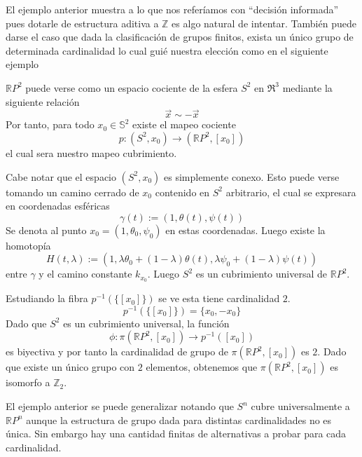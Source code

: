 El ejemplo anterior muestra a lo que nos referíamos con ``decisión
informada'' pues dotarle de estructura aditiva a \(\mathbb Z\) es algo
natural de intentar. También puede darse el caso que dada la
clasificación de grupos finitos, exista un único grupo de determinada
cardinalidad lo cual guié nuestra elección como en el siguiente ejemplo

\begin{ejemplo}
  \(\mathbb R P^2\) puede verse como un espacio cociente de la esfera
  \(S^2\)  en \(\Re^3\) mediante la siguiente relación
  \[ \vec x \sim - \vec x \]
  Por tanto, para todo \(x_0 \in \mathbb S^2\) existe el mapeo cociente
  \[ p : (S^2, x_0) \longrightarrow (\mathbb R P^2, [x_0]) \]
  el cual sera nuestro mapeo cubrimiento.

  Cabe notar que el espacio \((S^2, x_0)\) es simplemente conexo. Esto puede
  verse tomando un camino cerrado de \(x_0\) contenido en \(S^2\)
  arbitrario, el cual se expresara en coordenadas esféricas
  \[ \gamma (t) := (1 , \theta (t) , \psi(t) )\]
  Se denota al punto \(x_0 = (1, \theta_0, \psi_0)\) en estas
  coordenadas. Luego existe la homotopía
  \[ H (t, \lambda) := (1, \lambda \theta_0 + (1-\lambda) \theta(t),
    \lambda \psi_0 + (1-\lambda) \psi(t))\]
  entre \(\gamma\) y el camino constante \(k_{x_0}\). Luego \(S^2\) es
  un cubrimiento universal de \(\mathbb R P^2\).

  Estudiando la fibra \(p^{-1} (\{[x_0]\})\) se ve esta tiene
  cardinalidad \(2\).
  \[ p^{-1} (\{[x_0]\}) = \{ x_0 , - x_0 \} \]
  Dado que \(S^2\) es un cubrimiento universal, la función
  \[ \phi : \pi ( \mathbb R P^2 , [x_0]) \longrightarrow p^{-1}
    ([x_0])\]
  es biyectiva y por tanto la cardinalidad de grupo de \(\pi ( \mathbb R
  P^2, [x_0])\) es \(2\). Dado que existe un único grupo con \(2\)
  elementos, obtenemos que \(\pi ( \mathbb R P^2, [x_0])\) es isomorfo a
  \(\mathbb Z_2\).
\end{ejemplo}

El ejemplo anterior se puede generalizar notando que \(S^n\) cubre
universalmente a \(\mathbb R P^n\) aunque la estructura de grupo dada
para distintas cardinalidades no es única. Sin embargo hay una cantidad
finitas de alternativas a probar para cada cardinalidad.


